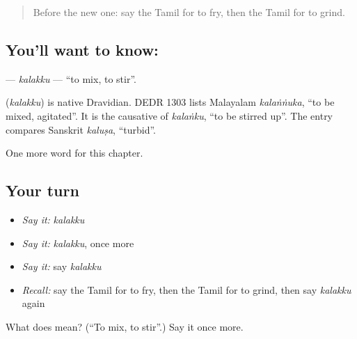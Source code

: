 \begin{quote}
Before the new one: say the Tamil for to fry, then the Tamil for to grind.
\end{quote}

\subsection*{You'll want to know: }
\textbf{} — \emph{kalakku} — \textquotedblleft{}to mix, to stir\textquotedblright{}.

\begin{cousinweb}
\textbf{} (\emph{kalakku}) is native Dravidian. DEDR 1303 lists Malayalam \emph{kalaṅṅuka}, \textquotedblleft{}to be mixed, agitated\textquotedblright{}. It is the causative of \emph{kalaṅku}, \textquotedblleft{}to be stirred up\textquotedblright{}. The entry compares Sanskrit \emph{kaluṣa}, \textquotedblleft{}turbid\textquotedblright{}.
\end{cousinweb}

\begin{grammarlens}[title={What you've built}]
One more word for this chapter.
\end{grammarlens}

\subsection*{Your turn}
\begin{itemize}
\raggedright
  \item \emph{Say it:} \emph{kalakku}
  \item \emph{Say it:} \emph{kalakku}, once more
  \item \emph{Say it:} say \emph{kalakku}
  \item \emph{Recall:} say the Tamil for to fry, then the Tamil for to grind, then say \emph{kalakku} again
\end{itemize}

\begin{tcolorbox}[breakable,colback=teal!4,colframe=teal!35!black,title={Before you move on}]
What does  mean? (\textquotedblleft{}To mix, to stir\textquotedblright{}.) Say it once more.
\end{tcolorbox}
